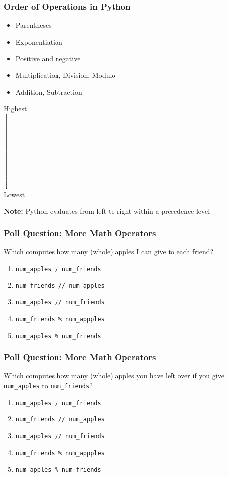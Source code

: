 \documentclass{beamer}
\newcommand{\xdownarrow}[1]{%
  {\left\downarrow\vbox to #1{}\right.\kern-\nulldelimiterspace}
}
\begin{document}
%
%
%
\begin{frame}
  \frametitle{Order of Operations in Python}
  \centering
  \begin{minipage}{0.49\textwidth}
    \begin{itemize}
      \item Parentheses 
      \item Exponentiation
      \item Positive and negative
      \item Multiplication, Division, Modulo
      \item Addition, Subtraction 
    \end{itemize}
  \end{minipage}
  \begin{minipage}{0.2\textwidth}
    \centering
    Highest\\
    $\xdownarrow{2cm}$\\
    Lowest\\
  \end{minipage}
  \vfill
  \textbf{Note:} Python evaluates from left to right within a precedence level
\end{frame}


%
%
%
\begin{frame}[fragile]
  \frametitle{Poll Question: More Math Operators}
  \vfill
  Which computes how many (whole) apples I can give to each friend?
  \begin{enumerate}
    \item \lstinline|num_apples / num_friends|
    \item \lstinline|num_friends // num_apples|
    \item \lstinline|num_apples // num_friends|
    \item \lstinline|num_friends % num_appples|
    \item \lstinline|num_apples % num_friends|
  \end{enumerate}
\end{frame}

%
%
%
\begin{frame}[fragile]
  \frametitle{Poll Question: More Math Operators}
  \vfill
  Which computes how many (whole) apples you have left over if you give \lstinline|num_apples| to \lstinline|num_friends|?
  \begin{enumerate}
    \item \lstinline|num_apples / num_friends|
    \item \lstinline|num_friends // num_apples|
    \item \lstinline|num_apples // num_friends|
    \item \lstinline|num_friends % num_appples|
    \item \lstinline|num_apples % num_friends|
  \end{enumerate}
\end{frame}
\end{document}
